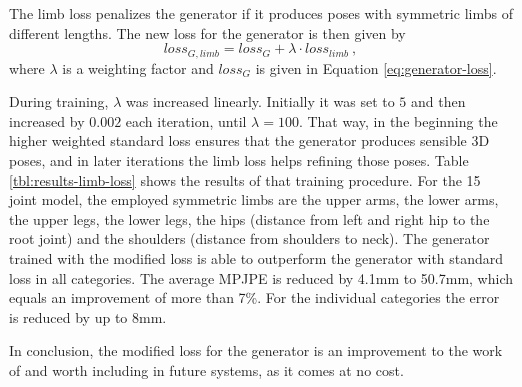 The limb loss penalizes the generator if it produces poses with symmetric limbs of different lengths.
The new loss for the generator is then given by
\begin{equation}
	loss_{G, limb} = loss_G + \lambda \cdot loss_{limb} \ ,
\end{equation}
where $\lambda$ is a weighting factor and $loss_G$ is given in Equation \eqref{eq:generator-loss}.



During training, $\lambda$ was increased linearly.
Initially it was set to $5$ and then increased by $0.002$ each iteration, until $\lambda = 100$.
That way, in the beginning the higher weighted standard loss ensures that the generator produces sensible 3D poses, and in later iterations the limb loss helps refining those poses.
Table \ref{tbl:results-limb-loss} shows the results of that training procedure.
For the 15 joint model, the employed symmetric limbs are the upper arms, the lower arms, the upper legs, the lower legs, the hips (distance from left and right hip to the root joint) and the shoulders (distance from shoulders to neck). 
The generator trained with the modified loss is able to outperform the generator with standard loss in all categories.
The average MPJPE is reduced by 4.1mm to 50.7mm, which equals an improvement of more than 7\%.
For the individual categories the error is reduced by up to 8mm.

In conclusion, the modified loss for the generator is an improvement to the work of \citet{drover18} and worth including in future systems, as it comes at no cost.



